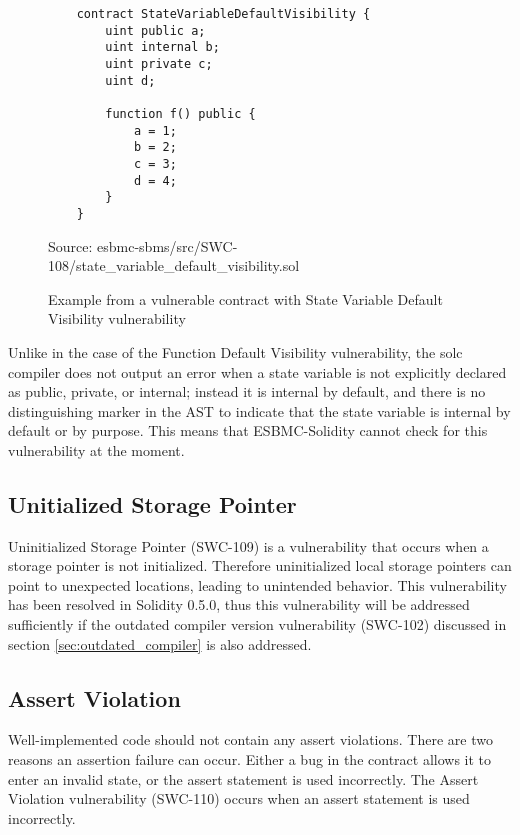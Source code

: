 \begin{figure}
\begin{lstlisting}
    contract StateVariableDefaultVisibility {
        uint public a;
        uint internal b;
        uint private c;
        uint d;
    
        function f() public {
            a = 1;
            b = 2;
            c = 3;
            d = 4;
        }
    }
\end{lstlisting}
\caption{Example from a vulnerable contract with State Variable Default Visibility vulnerability }
Source: esbmc-sbms/src/SWC-108/state\_variable\_default\_visibility.sol
\label{fig:state_variable_default_visibility}
\end{figure}

Unlike in the case of the Function Default Visibility vulnerability, the solc compiler does not output an error when a state variable is not explicitly declared as public, private, or internal; instead it is internal by default, and there is no distinguishing marker in the AST to indicate that the state variable is internal by default or by purpose. This means that ESBMC-Solidity cannot check for this vulnerability at the moment.

\subsection{Unitialized Storage Pointer}
\label{sec:uninitialized_storage_pointer}

Uninitialized Storage Pointer (SWC-109) is a vulnerability that occurs when a storage pointer is not initialized. Therefore uninitialized local storage pointers can point to unexpected locations, leading to unintended behavior. This vulnerability has been resolved in Solidity 0.5.0, thus this vulnerability will be addressed sufficiently if the outdated compiler version vulnerability (SWC-102) discussed in section \ref{sec:outdated_compiler} is also addressed.

\subsection{Assert Violation}
\label{sec:assert_violation}

Well-implemented code should not contain any assert violations. There are two reasons an assertion failure can occur. Either a bug in the contract allows it to enter an invalid state, or the assert statement is used incorrectly. The Assert Violation vulnerability (SWC-110) occurs when an assert statement is used incorrectly. 

